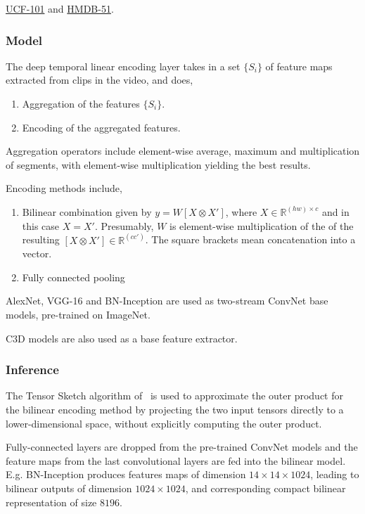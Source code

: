 \documentclass[a4paper, 12pt]{article}
\begin{document}
\hyperref[ucf101]{UCF-101} and \hyperref[hmdb51]{HMDB-51}.

\subsubsection{Model}

The deep temporal linear encoding layer takes in a set $\{S_i\}$ of feature
maps extracted from clips in the video, and does,

\begin{enumerate}
        \item Aggregation of the features $\{S_i\}$.
        \item Encoding of the aggregated features.
\end{enumerate}

Aggregation operators include element-wise average, maximum and multiplication
of segments, with element-wise multiplication yielding the best results.

Encoding methods include,

\begin{enumerate}
        \item Bilinear combination given by $y = W[X \otimes X']$, where $X \in
                \mathbb{R}^{(hw) \times c}$ and in this case $X = X'$.
                Presumably, $W$ is element-wise multiplication of the of the
                resulting $[X \otimes X'] \in \mathbb{R}^{(cc')}$. The square
                brackets mean concatenation into a vector.

        \item Fully connected pooling
\end{enumerate}

AlexNet, VGG-16 and BN-Inception are used as two-stream ConvNet base models,
pre-trained on ImageNet.

C3D models are also used as a base feature extractor.

\subsubsection{Inference}

The Tensor Sketch algorithm of~\citet{Pham:2013:FSP:2487575.2487591} is used to
approximate the outer product for the bilinear encoding method by projecting
the two input tensors directly to a lower-dimensional space, without explicitly
computing the outer product.

Fully-connected layers are dropped from the pre-trained ConvNet models and the
feature maps from the last convolutional layers are fed into the bilinear
model. E.g. BN-Inception produces features maps of dimension $14 \times 14
\times 1024$, leading to bilinear outputs of dimension $1024 \times 1024$, and
corresponding compact bilinear representation of size $8196$.
\end{document}
